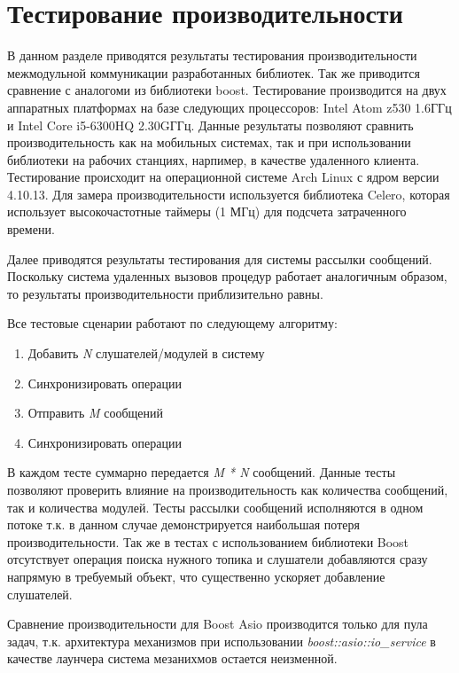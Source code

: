 \section{Тестирование производительности}

В данном разделе приводятся результаты тестирования производительности межмодульной коммуникации разработанных библиотек. Так же приводится сравнение с аналогоми из библиотеки boost. Тестирование производится на двух аппаратных платформах на базе следующих процессоров: Intel Atom z530 1.6ГГц и Intel Core i5-6300HQ 2.30GГГц. Данные результаты позволяют сравнить производительность как на мобильных системах, так и при использовании библиотеки на рабочих станциях, нарпимер, в качестве удаленного клиента. Тестирование происходит на операционной системе Arch Linux с ядром версии 4.10.13. Для замера производительности используется библиотека Celero, которая использует высокочастотные таймеры (1 МГц) для подсчета затраченного времени.

Далее приводятся результаты тестирования для системы рассылки сообщений. Поскольку система удаленных вызовов процедур работает аналогичным образом, то результаты производительности приблизительно равны.

Все тестовые сценарии работают по следующему алгоритму:

\begin{enumerate}
    \item Добавить \textit{N} слушателей/модулей в систему
    \item Синхронизировать операции
    \item Отправить \textit{M} сообщений
    \item Синхронизировать операции
\end{enumerate}

В каждом тесте суммарно передается \textit{M * N} сообщений. Данные тесты позволяют проверить влияние на производительность как количества сообщений, так и количества модулей. Тесты рассылки сообщений исполняются в одном потоке т.к. в данном случае демонстрируется наибольшая потеря производительности. Так же в тестах с использованием библиотеки Boost отсутствует операция поиска нужного топика и слушатели добавляются сразу напрямую в требуемый объект, что существенно ускоряет добавление слушателей.

Сравнение производительности для Boost Asio производится только для пула задач, т.к. архитектура механизмов при использовании \textit{boost::asio::io\_service} в качестве лаунчера система мезанихмов остается неизменной.


